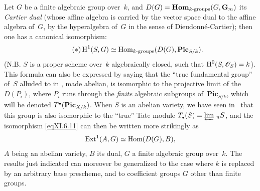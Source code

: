 \begin{remarks}
Let $G$ be a finite algebraic group over~$k$, and
$D(G)=\operatorname{\mathbf{Hom}}_{k\textup{-groups}}(G,\mathbf{G}_m)$ its \emph{Cartier
dual} (whose affine algebra is carried by the vector space
dual to the affine algebra of~$G$, \ie by
the hyperalgebra of~$G$ in the sense of Dieudonn\'e-Cartier); then one
has a canonical isomorphism:
\begin{equation}\label{eqXI.6.11}\tag{$*$}
\operatorname{H}^1(S,G)\simeq\operatorname{Hom}_{k\textup{-groups}}(D(G),\mathbf{Pic}_{S/k}).
\end{equation}
(N.B. $S$ is a proper scheme over~$k$ algebraically closed, such
that $\H^0(S,\cal{O}_S)=k$). This formula can also be expressed by
saying that the ``true fundamental group'' of~$S$ alluded to
in \No {}, made abelian, is isomorphic to the
projective limit of the $D(P_i)$, where $P_i$ runs through the
\emph{finite} algebraic subgroups of~$\mathbf{Pic}_{S/k}$, which will be denoted
$T^{\scriptscriptstyle\bullet}(\mathbf{Pic}_{X/k})$. When $S$ is an abelian
variety, we have seen in~ that this group is
also isomorphic to the ``true'' Tate module
$T_{{\scriptscriptstyle\bullet}}(S)=\varprojlim\, {{_n}S}$, and the isomorphism
\eqref{eqXI.6.11} can then be written more strikingly as
$$
\operatorname{Ext}^1(A,G)\simeq\operatorname{Hom}(D(G),B),
$$
$A$ being an abelian variety, $B$ its dual, $G$ a
finite algebraic group over~$k$. The results just
indicated can moreover be generalized to the case where $k$
is replaced by an arbitrary base prescheme, and to
coefficient groups $G$ other than finite groups.
\end{remarks}

